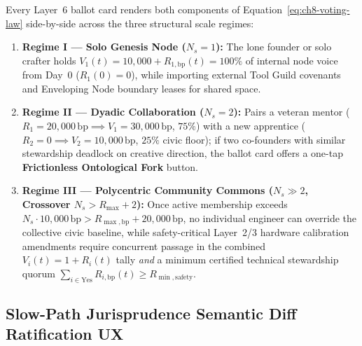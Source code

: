 Every Layer~6 ballot card renders both components of Equation~\eqref{eq:ch8-voting-law} side-by-side across the three structural scale regimes:
\begin{enumerate}
    \item \textbf{Regime I --- Solo Genesis Node ($N_s = 1$):} The lone founder or solo crafter holds $V_1(t) = 10{,}000 + R_{1,\mathrm{bp}}(t) = 100\%$ of internal node voice from Day~0 ($R_1(0) = 0$), while importing external Tool Guild covenants and Enveloping Node boundary leases for shared space.
    \item \textbf{Regime II --- Dyadic Collaboration ($N_s = 2$):} Pairs a veteran mentor ($R_1 = 20{,}000\,\mathrm{bp} \implies V_1 = 30{,}000\,\mathrm{bp}$, $75\%$) with a new apprentice ($R_2 = 0 \implies V_2 = 10{,}000\,\mathrm{bp}$, $25\%$ civic floor); if two co-founders with similar stewardship deadlock on creative direction, the ballot card offers a one-tap \textbf{Frictionless Ontological Fork} button.
    \item \textbf{Regime III --- Polycentric Community Commons ($N_s \gg 2$, Crossover $N_s > R_{\max} + 2$):} Once active membership exceeds $N_s \cdot 10{,}000\,\mathrm{bp} > R_{\max,\mathrm{bp}} + 20{,}000\,\mathrm{bp}$, no individual engineer can override the collective civic baseline, while safety-critical Layer~2/3 hardware calibration amendments require concurrent passage in the combined $V_i(t) = 1 + R_i(t)$ tally \emph{and} a minimum certified technical stewardship quorum $\sum_{i \in \mathrm{Yes}} R_{i,\mathrm{bp}}(t) \ge R_{\min,\mathrm{safety}}$.
\end{enumerate}

\subsection{Slow-Path Jurisprudence Semantic Diff Ratification UX}

